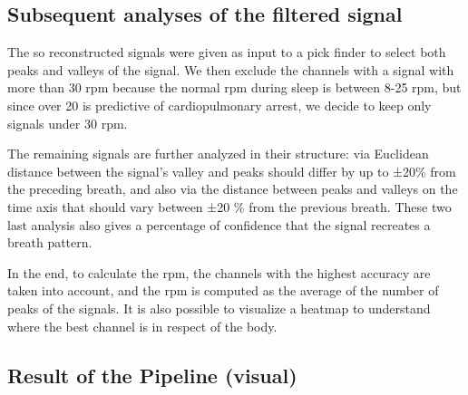 \subsection{Subsequent analyses of the filtered signal}


The so reconstructed signals were given as input to a pick finder to select both peaks and valleys of the signal. 
We then exclude the channels with a signal with more than 30 rpm because the normal rpm during sleep is between 8-25 rpm, but since over 20 is predictive of cardiopulmonary arrest, we decide to keep only signals under 30 rpm.

The remaining signals are further analyzed in their structure: via Euclidean distance between the signal's valley and peaks should differ by up to ±20$\%$ from the preceding breath, and also via the distance between peaks and valleys on the time axis that should vary between ±20 \% from the previous breath.
These two last analysis also gives a percentage of confidence that the signal recreates a breath pattern.

In the end, to calculate the rpm, the channels with the highest accuracy are taken into account, and the rpm is computed as the average of the number of peaks of the signals.
It is also possible to visualize a heatmap to understand where the best channel is in respect of the body. 

\subsection{Result of the Pipeline (visual)}